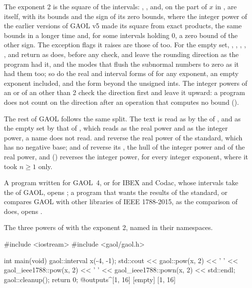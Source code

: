 \medskip
The exponent 2 is the square of the intervals: ,
,  and, on the part of $x$
in ,  are 
itself, with its bounds and the sign of its zero bounds, where the integer
power of the earlier versions of GAOL v5 made its square from exact products, the same bounds in a longer time
and, for some intervals holding 0, a zero bound of the other
sign.\newinvfive{} The exception flags it raises are those of 
too. For the empty set, , ,
, , ,
 and 
return as  does, before any check, and leave the rounding direction
as the program had it, and the modes that flush the subnormal numbers to zero
as it had them too; so do the real and interval forms of  for any
exponent, an empty exponent included, and the  form beyond
the unsigned ints.\newinvfive{} The integer powers of an  or of an
 other than 2 check the direction first and leave it
upward: a program does not count on the direction after an operation that
computes no bound ().

\medskip
The rest of GAOL follows the same split. The text  is read as  by the
 of , and as the empty set by that of
, which reads  as the real power and
 as the integer power, a name  does not
read.  and  reverse the real power of the
standard, which has no negative base;  and
 of  reverse its , the hull of
the integer power and of the real power, and 
() reverses the integer power, for every integer exponent, where
it took $n\geq 1$ only.\newinvfive

A program written for GAOL~4, or for IBEX and Codac, whose intervals take the
 of GAOL, opens ; a program that wants the results of the
standard, or compares GAOL with other libraries of IEEE 1788-2015, as the
comparison of  does, opens .

\begin{Ex}\label{ex:pow-namespaces}
The three powers of  with the exponent 2, named in their
namespaces.
\begin{example}
#include <iostream>
#include <gaol/gaol.h>

int main(void)
{
  gaol::interval x(-4, -1);
  std::cout << gaol::pow(x, 2) << ' '
            << gaol_ieee1788::pow(x, 2) << ' '
            << gaol_ieee1788::pown(x, 2) << std::endl;
  gaol::cleanup();
  return 0;
}
@outputs^[1, 16] [empty] [1, 16]~
\end{example}
\end{Ex}

